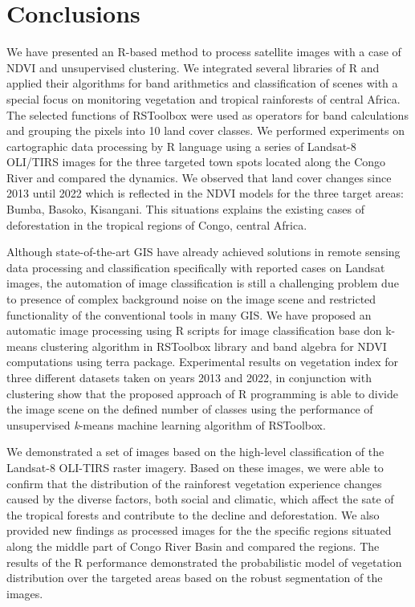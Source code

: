 \documentclass[applsci,article,submit,pdftex,moreauthors]{Definitions/mdpi}
\begin{document}
\section{Conclusions}

We have presented an R-based method to process satellite images with a case of NDVI and unsupervised clustering. We integrated several libraries of R and applied their algorithms for band arithmetics and classification of scenes with a special focus on monitoring vegetation and tropical rainforests of central Africa. The selected functions of RSToolbox were used as operators for band calculations and grouping the pixels into 10 land cover classes. We performed experiments on cartographic data processing by R language using a series of Landsat-8 OLI/TIRS images for the three targeted town spots located along the Congo River and compared the dynamics. We observed that land cover changes since 2013 until 2022 which is reflected in the NDVI models for the three target areas: Bumba, Basoko, Kisangani. This situations explains the existing cases of deforestation in the tropical regions of Congo, central Africa. 

Although state-of-the-art GIS have already achieved solutions in remote sensing data processing and classification specifically with reported cases on Landsat images, the automation of image classification is still a challenging problem due to presence of complex background noise on the image scene and restricted functionality of the conventional tools in many GIS. We have proposed an automatic image processing using R scripts for image classification base don k-means clustering algorithm in RSToolbox library and band algebra for NDVI computations using terra package. Experimental results on vegetation index for three different datasets taken on years 2013 and 2022, in conjunction with clustering show that the proposed approach of R programming is able to divide the image scene on the defined number of classes using the performance of unsupervised \emph{k}-means machine learning algorithm of RSToolbox.

We demonstrated a set of images based on the high-level classification of the Landsat-8 OLI-TIRS raster imagery. Based on these images, we were able to confirm that the distribution of the rainforest vegetation experience changes caused by the diverse factors, both social and climatic, which affect the sate of the tropical forests and contribute to the decline and deforestation. We also provided new findings as processed images for the the specific regions situated along the middle part of Congo River Basin and compared the regions. The results of the R performance demonstrated the probabilistic model of vegetation distribution over the targeted areas based on the robust segmentation of the images. 
\end{document}
